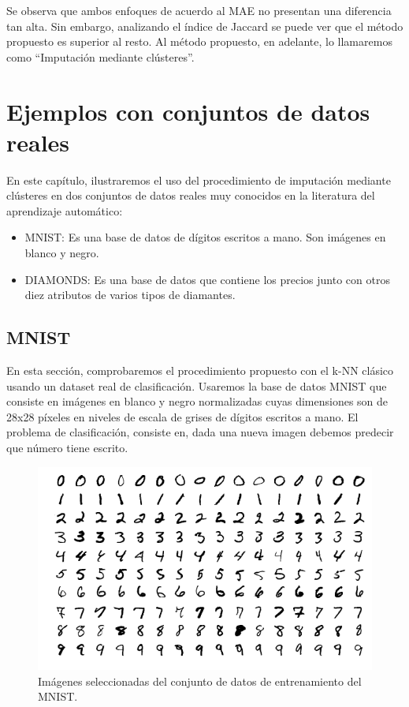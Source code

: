 \documentclass[12pt]{report} %
\theoremstyle{definition}
\begin{document}
Se observa que ambos enfoques de acuerdo al MAE no presentan una diferencia tan alta. Sin embargo, analizando el índice de Jaccard se puede ver que el método propuesto es superior al resto. Al método propuesto, en adelante, lo llamaremos como ``Imputación mediante clústeres''.

\chapter{Ejemplos con conjuntos de datos reales}

En este capítulo, ilustraremos el uso del procedimiento de imputación mediante clústeres en dos conjuntos de datos reales muy conocidos en la literatura del aprendizaje automático:
\begin{itemize}
	\item MNIST: Es una base de datos de dígitos escritos a mano. Son imágenes en blanco y negro.
	\item DIAMONDS: Es una base de datos que contiene los precios junto con otros diez atributos de varios tipos de diamantes.
\end{itemize}

\section{MNIST}
En esta sección, comprobaremos el procedimiento propuesto con el k-NN clásico usando un dataset real de clasificación. Usaremos la base de datos MNIST que consiste en imágenes en blanco y negro normalizadas cuyas dimensiones son de 28x28 píxeles en niveles de escala de grises de dígitos escritos a mano. El problema de clasificación, consiste en, dada una nueva imagen debemos predecir que número tiene escrito.\\

\begin{figure}[H]
	\centering
	\includegraphics[scale=0.6]{imagenes/mnist.png}
	\caption{Imágenes seleccionadas del conjunto de datos de entrenamiento del MNIST.}
\end{figure}
\end{document}
